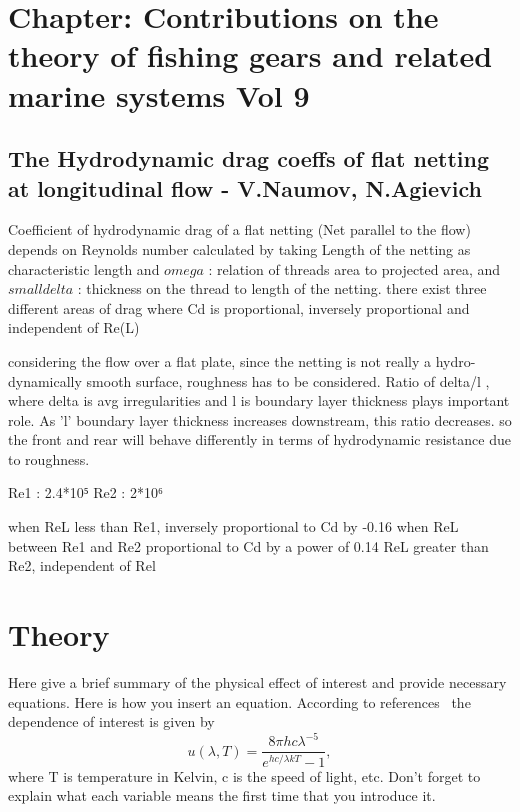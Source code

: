 \documentclass[letterpaper,12pt]{article}
\begin{document}

\section{Chapter: Contributions on the theory of fishing gears and related marine systems Vol 9 }

\subsection{The Hydrodynamic drag coeffs of flat netting at longitudinal flow - V.Naumov, N.Agievich}
Coefficient of hydrodynamic drag of a flat netting (Net parallel to the flow) depends on Reynolds number calculated by taking Length of the netting as characteristic length and \(omega\) : relation of threads area to projected area, and \(small delta\) : thickness on the thread to length of the netting. there exist three different areas of drag where Cd is proportional, inversely proportional and independent of Re(L)

considering the flow over a flat plate, since the netting is not really a hydro-dynamically smooth surface, roughness has to be considered. Ratio of delta/l , where delta is avg irregularities and l is boundary layer thickness plays important role. As 'l' boundary layer thickness increases downstream, this ratio decreases.  so the front and rear will behave differently in terms of hydrodynamic resistance due to roughness.

Re1 : 2.4*10⁵ 
Re2 : 2*10⁶

when ReL less than Re1, inversely proportional to Cd by -0.16
when ReL between Re1 and Re2 proportional to Cd by a power of 0.14
ReL greater than Re2, independent of Rel

\section{Theory}

Here give a brief summary of the physical effect of interest and provide
necessary equations. Here is how you insert an equation. According to
references~\cite{melissinos, Cyr, Wiki} the dependence of interest is given
by
\begin{equation} \label{eq:aperp} %
u(\lambda,T)=\frac{8\pi hc\lambda^{-5}}{e^{hc/\lambda kT}-1},
\end{equation}
where T is temperature in Kelvin, c is the speed of light, etc. Don't forget to
explain what each variable means the first time that you introduce it.
\end{document}
